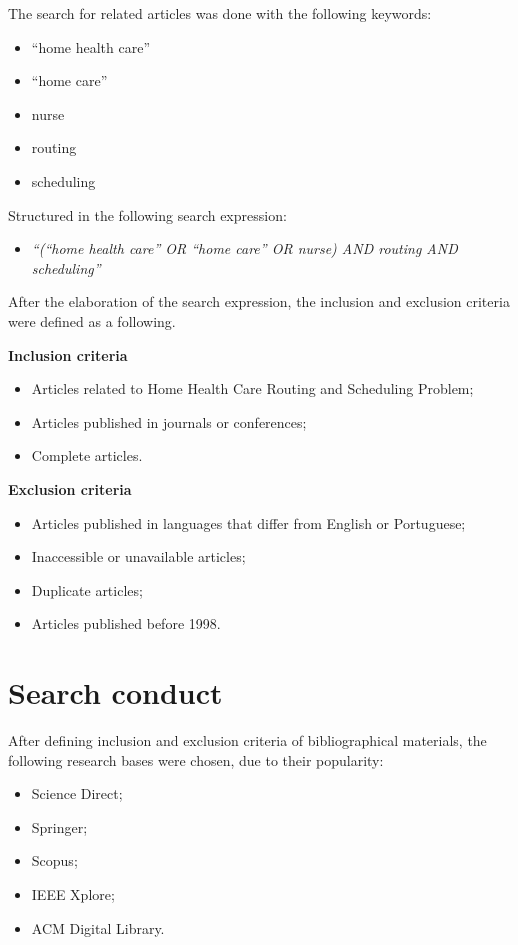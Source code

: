 The search for related articles was done with the following keywords:

\begin{itemize}
\item ``home health care''
\item ``home care''
\item nurse
\item routing
\item scheduling
\end{itemize}

Structured in the following search expression:

\begin{itemize}
\item \textit{``(``home health care'' OR ``home care'' OR nurse) AND routing AND scheduling''}
\end{itemize}

After the elaboration of the search expression, the inclusion and exclusion criteria were defined as a following.

\textbf{Inclusion criteria}
\begin{itemize}
\item Articles related to Home Health Care Routing and Scheduling Problem;
\item Articles published in journals or conferences;
\item Complete articles.
\end{itemize}

\textbf{Exclusion criteria}
\begin{itemize}
\item Articles published in languages that differ from English or Portuguese;
\item Inaccessible or unavailable articles;
\item Duplicate articles;
\item Articles published before 1998.
\end{itemize}

\section{Search conduct}

After defining inclusion and exclusion criteria of bibliographical materials, the following research bases were chosen, due to their popularity:

\begin{itemize}
\item Science Direct;
\item Springer;
\item Scopus;
\item IEEE Xplore;
\item ACM Digital Library.
\end{itemize}

